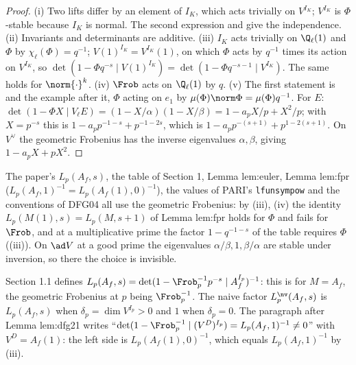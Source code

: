 \begin{proof}
(i) Two lifts differ by an element of $I_K$, which acts trivially on $V^{I_K}$; $V^{I_K}$ is $\Phi$-stable because $I_K$ is normal. The second expression and
 give the independence. (ii) Invariants and determinants are additive. (iii) $I_K$ acts trivially on $\Q_\ell(1)$ and $\Phi$ by
$\chi_\ell(\Phi)=q^{-1}$; $V(1)^{I_K}=V^{I_K}(1)$, on which $\Phi$ acts by $q^{-1}$ times its action on $V^{I_K}$, so $\det(1-\Phi q^{-s}\mid V(1)^{I_K})=\det(1-\Phi q^{-s-1}\mid V^{I_K})$.
The same holds for $\norm{\cdot}^k$. (iv) $\Frob$ acts on $\Q_\ell(1)$ by $q$. (v) The first statement is  and the example after it,
$\Phi$ acting on $e_1$ by $\mu(\Phi)\norm\Phi=\mu(\Phi)q^{-1}$. For $E$: $\det(1-\Phi X\mid V_\ell E)=(1-X/\alpha)(1-X/\beta)=1-a_pX/p+X^2/p$; with $X=p^{-s}$ this is
$1-a_pp^{-1-s}+p^{-1-2s}$, which is $1-a_pp^{-(s+1)}+p^{1-2(s+1)}$. On $V^\vee$ the geometric Frobenius has the inverse eigenvalues $\alpha,\beta$, giving
$1-a_pX+pX^2$.
\end{proof}

\begin{warning}\label{warn:local:geometric}
The paper's $L_p(A_f,s)$, the table of Section 1, Lemma lem:euler, Lemma lem:fpr ($L_p(A_f,1)^{-1}=L_p(A_f(1),0)^{-1}$), the values of PARI's
\texttt{lfunsympow} and the conventions of DFG04 \cite[Section 1.7.2]{DFG04} all use the geometric Frobenius: by (iii), (iv) the identity
$L_p(M(1),s)=L_p(M,s+1)$ of Lemma lem:fpr holds for $\Phi$ and fails for $\Frob$, and at a multiplicative prime the factor $1-q^{-1-s}$ of the table
requires $\Phi$ ((iii)). On $\ad V$ at a good prime the eigenvalues $\alpha/\beta,1,\beta/\alpha$ are stable under inversion, so there
the choice is invisible.
\end{warning}

\begin{paperlink}\label{pl:local:Lfactor}
Section 1.1 defines $L_p(A_f,s)=\det(1-\Frob_p^{-1}p^{-s}\mid A_f^{I_p})^{-1}$: this is  for $M=A_f$, the geometric Frobenius
at $p$ being $\Frob_p^{-1}$. The naive factor
$L_p^{\nv}(A_f,s)$ is $L_p(A_f,s)$ when $\delta_p=\dim V^{I_p}>0$ and $1$ when $\delta_p=0$. The paragraph after Lemma lem:dfg21 writes
``$\det(1-\Frob_p^{-1}\mid(V^D)^{I_p})=L_p(A_f,1)^{-1}\ne0$'' with $V^D=A_f(1)$: the left side is $L_p(A_f(1),0)^{-1}$, which equals $L_p(A_f,1)^{-1}$ by
(iii).
\end{paperlink}

